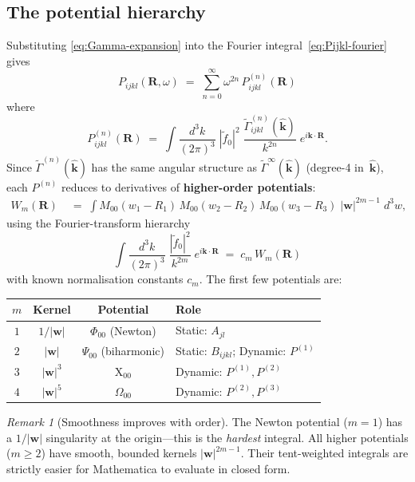 \documentclass[11pt,a4paper]{article}
\newcommand{\bR}{\bm{R}}
\newcommand{\bk}{\bm{k}}
\newcommand{\bw}{\bm{w}}
\newcommand{\kh}{\hat{\bm{k}}}
\theoremstyle{plain}
\theoremstyle{remark}
\newtheorem{remark}[theorem]{Remark}
\begin{document}
\subsection{The potential hierarchy}

Substituting \eqref{eq:Gamma-expansion} into the Fourier
integral~\eqref{eq:Pijkl-fourier} gives
\begin{equation}
  P_{ijkl}(\bR,\omega)
  \;=\;
  \sum_{n=0}^{\infty}
  \omega^{2n}\,P^{(n)}_{ijkl}(\bR)
  \label{eq:P-series}
\end{equation}
where
\begin{equation}
  P^{(n)}_{ijkl}(\bR)
  \;=\;
  \int\!\frac{d^3k}{(2\pi)^3}\;
  |\tilde{f}_0|^2\;
  \frac{\tilde{\Gamma}^{(n)}_{ijkl}(\kh)}{k^{2n}}\;
  e^{i\bk\cdot\bR}.
  \label{eq:Pn-fourier}
\end{equation}
Since $\tilde{\Gamma}^{(n)}(\kh)$ has the same angular structure as
$\tilde{\Gamma}^\infty(\kh)$ (degree-4 in~$\kh$), each $P^{(n)}$
reduces to derivatives of \textbf{higher-order potentials}:
\begin{align}
  W_m(\bR) &\;=\;
  \int M_{00}(w_1-R_1)\,M_{00}(w_2-R_2)\,M_{00}(w_3-R_3)\;
  |\bw|^{2m-1}\;d^3w,
  \label{eq:Wm-def}
\end{align}
using the Fourier-transform hierarchy
\begin{equation}
  \int\!\frac{d^3k}{(2\pi)^3}\;
  \frac{|\tilde{f}_0|^2}{k^{2m}}\;e^{i\bk\cdot\bR}
  \;=\; c_m\,W_m(\bR)
  \label{eq:FT-hierarchy}
\end{equation}
with known normalisation constants $c_m$.
The first few potentials are:
\begin{center}
\begin{tabular}{cccl}
\toprule
$m$ & Kernel & Potential & Role \\
\midrule
$1$ & $1/|\bw|$  & $\Phi_{00}$ (Newton)     & Static: $A_{jl}$ \\
$2$ & $|\bw|$    & $\Psi_{00}$ (biharmonic)  & Static: $B_{ijkl}$; Dynamic: $P^{(1)}$ \\
$3$ & $|\bw|^3$  & $\mathrm{X}_{00}$        & Dynamic: $P^{(1)}, P^{(2)}$ \\
$4$ & $|\bw|^5$  & $\Omega_{00}$             & Dynamic: $P^{(2)}, P^{(3)}$ \\
\bottomrule
\end{tabular}
\end{center}

\begin{remark}[Smoothness improves with order]
The Newton potential ($m=1$) has a $1/|\bw|$ singularity at the
origin---this is the \emph{hardest} integral.  All higher potentials
($m\geq 2$) have smooth, bounded kernels $|\bw|^{2m-1}$.  Their
tent-weighted integrals are strictly easier for Mathematica to
evaluate in closed form.
\end{remark}
\end{document}
